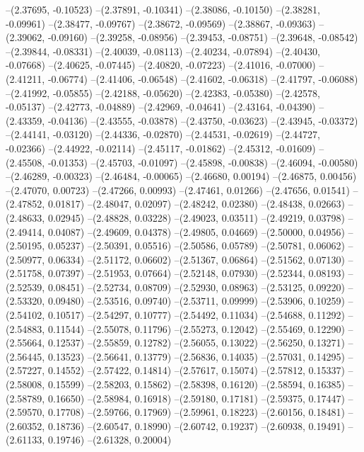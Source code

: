 --(2.37695, -0.10523)
--(2.37891, -0.10341)
--(2.38086, -0.10150)
--(2.38281, -0.09961)
--(2.38477, -0.09767)
--(2.38672, -0.09569)
--(2.38867, -0.09363)
--(2.39062, -0.09160)
--(2.39258, -0.08956)
--(2.39453, -0.08751)
--(2.39648, -0.08542)
--(2.39844, -0.08331)
--(2.40039, -0.08113)
--(2.40234, -0.07894)
--(2.40430, -0.07668)
--(2.40625, -0.07445)
--(2.40820, -0.07223)
--(2.41016, -0.07000)
--(2.41211, -0.06774)
--(2.41406, -0.06548)
--(2.41602, -0.06318)
--(2.41797, -0.06088)
--(2.41992, -0.05855)
--(2.42188, -0.05620)
--(2.42383, -0.05380)
--(2.42578, -0.05137)
--(2.42773, -0.04889)
--(2.42969, -0.04641)
--(2.43164, -0.04390)
--(2.43359, -0.04136)
--(2.43555, -0.03878)
--(2.43750, -0.03623)
--(2.43945, -0.03372)
--(2.44141, -0.03120)
--(2.44336, -0.02870)
--(2.44531, -0.02619)
--(2.44727, -0.02366)
--(2.44922, -0.02114)
--(2.45117, -0.01862)
--(2.45312, -0.01609)
--(2.45508, -0.01353)
--(2.45703, -0.01097)
--(2.45898, -0.00838)
--(2.46094, -0.00580)
--(2.46289, -0.00323)
--(2.46484, -0.00065)
--(2.46680, 0.00194)
--(2.46875, 0.00456)
--(2.47070, 0.00723)
--(2.47266, 0.00993)
--(2.47461, 0.01266)
--(2.47656, 0.01541)
--(2.47852, 0.01817)
--(2.48047, 0.02097)
--(2.48242, 0.02380)
--(2.48438, 0.02663)
--(2.48633, 0.02945)
--(2.48828, 0.03228)
--(2.49023, 0.03511)
--(2.49219, 0.03798)
--(2.49414, 0.04087)
--(2.49609, 0.04378)
--(2.49805, 0.04669)
--(2.50000, 0.04956)
--(2.50195, 0.05237)
--(2.50391, 0.05516)
--(2.50586, 0.05789)
--(2.50781, 0.06062)
--(2.50977, 0.06334)
--(2.51172, 0.06602)
--(2.51367, 0.06864)
--(2.51562, 0.07130)
--(2.51758, 0.07397)
--(2.51953, 0.07664)
--(2.52148, 0.07930)
--(2.52344, 0.08193)
--(2.52539, 0.08451)
--(2.52734, 0.08709)
--(2.52930, 0.08963)
--(2.53125, 0.09220)
--(2.53320, 0.09480)
--(2.53516, 0.09740)
--(2.53711, 0.09999)
--(2.53906, 0.10259)
--(2.54102, 0.10517)
--(2.54297, 0.10777)
--(2.54492, 0.11034)
--(2.54688, 0.11292)
--(2.54883, 0.11544)
--(2.55078, 0.11796)
--(2.55273, 0.12042)
--(2.55469, 0.12290)
--(2.55664, 0.12537)
--(2.55859, 0.12782)
--(2.56055, 0.13022)
--(2.56250, 0.13271)
--(2.56445, 0.13523)
--(2.56641, 0.13779)
--(2.56836, 0.14035)
--(2.57031, 0.14295)
--(2.57227, 0.14552)
--(2.57422, 0.14814)
--(2.57617, 0.15074)
--(2.57812, 0.15337)
--(2.58008, 0.15599)
--(2.58203, 0.15862)
--(2.58398, 0.16120)
--(2.58594, 0.16385)
--(2.58789, 0.16650)
--(2.58984, 0.16918)
--(2.59180, 0.17181)
--(2.59375, 0.17447)
--(2.59570, 0.17708)
--(2.59766, 0.17969)
--(2.59961, 0.18223)
--(2.60156, 0.18481)
--(2.60352, 0.18736)
--(2.60547, 0.18990)
--(2.60742, 0.19237)
--(2.60938, 0.19491)
--(2.61133, 0.19746)
--(2.61328, 0.20004)
